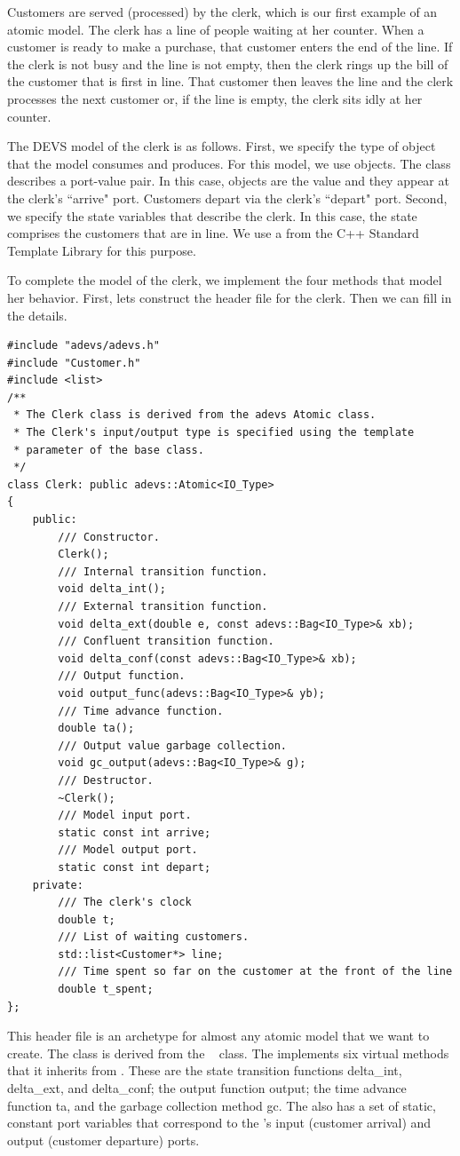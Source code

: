 Customers are served (processed) by the clerk, which is our first example of an atomic model. The clerk has a line of people waiting at her counter. When a customer is ready to make a purchase, that customer enters the end of the line. If the clerk is not busy and the line is not empty, then the clerk rings up the bill of the customer that is first in line. That customer then leaves the line and the clerk processes the next customer or, if the line is empty, the clerk sits idly at her counter.

The DEVS model of the clerk is as follows. First, we specify the type of object that the model consumes and produces. For this model, we use  objects. The  class describes a port-value pair. In this case,  objects are the value and they appear at the clerk's ``arrive" port. Customers depart via the clerk's ``depart" port. Second, we specify the state variables that describe the clerk. In this case, the state comprises the customers that are in line. We use a  from the C++ Standard Template Library for this purpose.

To complete the model of the clerk, we implement the four methods that model her behavior. First, lets construct the header file for the clerk. Then we can fill in the details.
\begin{verbatim}
#include "adevs/adevs.h"
#include "Customer.h"
#include <list>
/**
 * The Clerk class is derived from the adevs Atomic class.
 * The Clerk's input/output type is specified using the template
 * parameter of the base class.
 */
class Clerk: public adevs::Atomic<IO_Type>
{
    public:
        /// Constructor.
        Clerk();
        /// Internal transition function.
        void delta_int();
        /// External transition function.
        void delta_ext(double e, const adevs::Bag<IO_Type>& xb);
        /// Confluent transition function.
        void delta_conf(const adevs::Bag<IO_Type>& xb);
        /// Output function.
        void output_func(adevs::Bag<IO_Type>& yb);
        /// Time advance function.
        double ta();
        /// Output value garbage collection.
        void gc_output(adevs::Bag<IO_Type>& g);
        /// Destructor.
        ~Clerk();
        /// Model input port.
        static const int arrive;
        /// Model output port.
        static const int depart;
    private:
        /// The clerk's clock
        double t;
        /// List of waiting customers.
        std::list<Customer*> line;
        /// Time spent so far on the customer at the front of the line
        double t_spent;
};
\end{verbatim}
This header file is an archetype for almost any atomic model that we want to create. The  class is derived from the \adevs\  class. The  implements six virtual methods that it inherits from . These are the state transition functions delta\_int, delta\_ext, and delta\_conf; the output function output; the time advance function ta, and the garbage collection method gc. The  also has a set of static, constant port variables that correspond to the 's input (customer arrival) and output (customer departure) ports.

